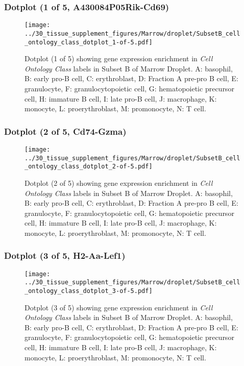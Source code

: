\clearpage

\subsubsection{Dotplot (1 of 5, A430084P05Rik-Cd69)}
\begin{figure}[h]
\centering
\texttt{[image: ../30\_tissue\_supplement\_figures/Marrow/droplet/SubsetB\_cell\_ontology\_class\_dotplot\_1-of-5.pdf]}

\caption{ Dotplot (1 of 5)  showing gene expression enrichment in \emph{Cell Ontology Class} labels in Subset B of Marrow Droplet. A: basophil, B: early pro-B cell, C: erythroblast, D: Fraction A pre-pro B cell, E: granulocyte, F: granulocytopoietic cell, G: hematopoietic precursor cell, H: immature B cell, I: late pro-B cell, J: macrophage, K: monocyte, L: proerythroblast, M: promonocyte, N: T cell.}
\end{figure}


\clearpage

\subsubsection{Dotplot (2 of 5, Cd74-Gzma)}
\begin{figure}[h]
\centering
\texttt{[image: ../30\_tissue\_supplement\_figures/Marrow/droplet/SubsetB\_cell\_ontology\_class\_dotplot\_2-of-5.pdf]}

\caption{ Dotplot (2 of 5)  showing gene expression enrichment in \emph{Cell Ontology Class} labels in Subset B of Marrow Droplet. A: basophil, B: early pro-B cell, C: erythroblast, D: Fraction A pre-pro B cell, E: granulocyte, F: granulocytopoietic cell, G: hematopoietic precursor cell, H: immature B cell, I: late pro-B cell, J: macrophage, K: monocyte, L: proerythroblast, M: promonocyte, N: T cell.}
\end{figure}


\clearpage

\subsubsection{Dotplot (3 of 5, H2-Aa-Lef1)}
\begin{figure}[h]
\centering
\texttt{[image: ../30\_tissue\_supplement\_figures/Marrow/droplet/SubsetB\_cell\_ontology\_class\_dotplot\_3-of-5.pdf]}

\caption{ Dotplot (3 of 5)  showing gene expression enrichment in \emph{Cell Ontology Class} labels in Subset B of Marrow Droplet. A: basophil, B: early pro-B cell, C: erythroblast, D: Fraction A pre-pro B cell, E: granulocyte, F: granulocytopoietic cell, G: hematopoietic precursor cell, H: immature B cell, I: late pro-B cell, J: macrophage, K: monocyte, L: proerythroblast, M: promonocyte, N: T cell.}
\end{figure}



